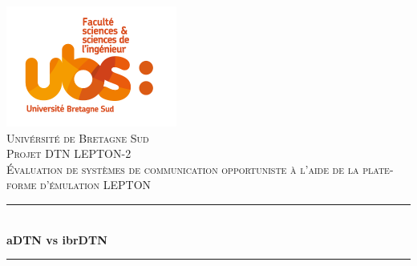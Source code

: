 \documentclass[a4paper,10pt]{article}
\begin{document}
\begin{titlepage}
  \begin{sffamily}
  \begin{center}


\includegraphics[scale=0.6]{images/logo.png}\\[1.5cm]
    

\textsc{\LARGE Univérsité de Bretagne Sud}\\[1.5cm]  %
\textsc{\Large Projet DTN LEPTON-2}\\[1cm]                %
\textsc{\large Évaluation de systèmes de communication opportuniste à l’aide de la plate-forme d’émulation LEPTON}\\[0.8cm]  %


    \newcommand{\HRule}{\rule{\linewidth}{0.5mm}} %
    
    \HRule \\[0.4cm]
    { \huge \bfseries aDTN vs ibrDTN\\[0.4cm] }
    \HRule \\[1.5cm]


\end{center}
\end{sffamily}
\end{titlepage}
\end{document}
